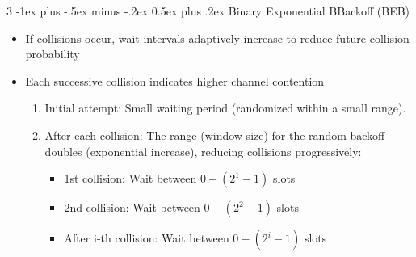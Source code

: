 \documentclass[a4paper, 9pt, landscape]{extarticle}
\makeatletter
\renewcommand{\subsubsection}{\@startsection{paragraph}{4}{0mm}%
                                {-1ex plus -.5ex minus -.2ex}%
                                {0.5ex plus .2ex}%
                                {\normalfont\footnotesize\bfseries}}
\makeatother
\begin{document}
\begin{multicols*}{3}
\subsubsection{Binary Exponential BBackoff (BEB)}
\begin{itemize}
  \item If collisions occur, wait intervals adaptively increase to reduce future collision probability
  \item Each successive collision indicates higher channel contention
  \begin{enumerate}
    \item Initial attempt: Small waiting period (randomized within a small range).
    \item After each collision: The range (window size) for the random backoff doubles (exponential increase), reducing collisions progressively:
    \begin{itemize}
      \item 1st collision: Wait between $0 - (2^1-1)$ slots
      \item 2nd collision: Wait between $0 - (2^2-1)$ slots
      \item After i-th collision: Wait between $0 - (2^i-1)$ slots
    \end{itemize}
  \end{enumerate}
\end{itemize}


\end{multicols*}
\end{document}
